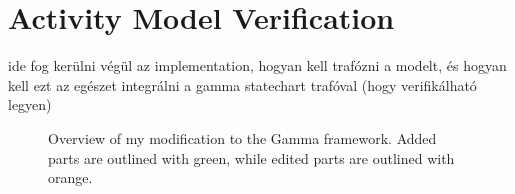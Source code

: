 \chapter{Activity Model Verification}\label{ch:activiy_verification}

ide fog kerülni végül az implementation, hogyan kell trafózni a modelt, és hogyan kell ezt az egészet integrálni a gamma statechart trafóval (hogy verifikálható legyen)

\begin{figure}[!ht]
	\centering
	
	\caption{Overview of my modification to the Gamma framework. Added parts are outlined with green, while edited parts are outlined with orange.}
	\label{fig:gamma-activity-overview}
\end{figure}




